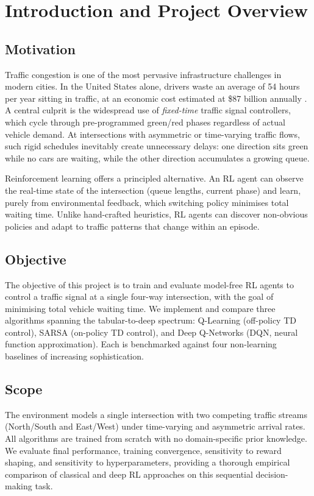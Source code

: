 \documentclass[12pt]{article}
\begin{document}
\newpage
\tableofcontents
\newpage

\section{Introduction and Project Overview}

\subsection{Motivation}
Traffic congestion is one of the most pervasive infrastructure challenges in modern
cities. In the United States alone, drivers waste an average of 54 hours per year
sitting in traffic, at an economic cost estimated at \$87 billion annually
\cite{inrix2019}. A central culprit is the widespread use of \emph{fixed-time} traffic
signal controllers, which cycle through pre-programmed green/red phases regardless of
actual vehicle demand. At intersections with asymmetric or time-varying traffic flows,
such rigid schedules inevitably create unnecessary delays: one direction sits green
while no cars are waiting, while the other direction accumulates a growing queue.

Reinforcement learning offers a principled alternative. An RL agent can observe the
real-time state of the intersection (queue lengths, current phase) and learn, purely
from environmental feedback, which switching policy minimises total waiting time. Unlike
hand-crafted heuristics, RL agents can discover non-obvious policies and adapt to
traffic patterns that change within an episode.

\subsection{Objective}
The objective of this project is to train and evaluate model-free RL agents to control
a traffic signal at a single four-way intersection, with the goal of minimising total
vehicle waiting time. We implement and compare three algorithms spanning the
tabular-to-deep spectrum: Q-Learning (off-policy TD control), SARSA (on-policy TD
control), and Deep Q-Networks (DQN, neural function approximation). Each is benchmarked
against four non-learning baselines of increasing sophistication.

\subsection{Scope}
The environment models a single intersection with two competing traffic streams (North/South
and East/West) under time-varying and asymmetric arrival rates. All algorithms are
trained from scratch with no domain-specific prior knowledge. We evaluate final performance,
training convergence, sensitivity to reward shaping, and sensitivity to hyperparameters,
providing a thorough empirical comparison of classical and deep RL approaches on this
sequential decision-making task.
\end{document}
